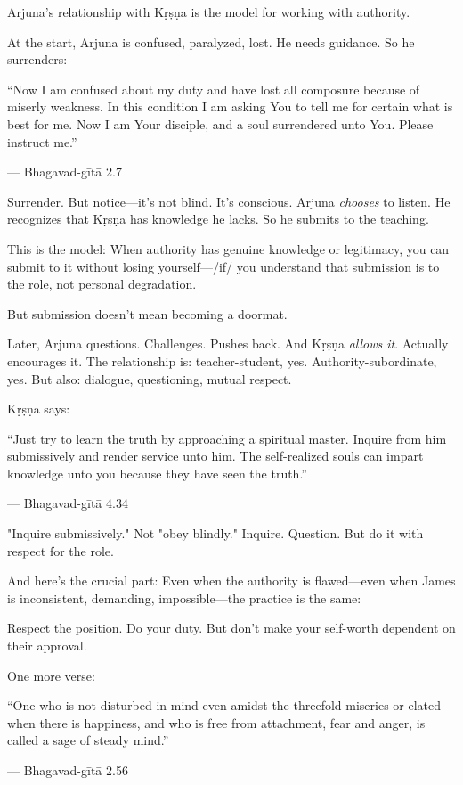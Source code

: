 \documentclass[11pt,twoside]{book}
\begin{document}
Arjuna's relationship with Kṛṣṇa is the model for working with authority.

At the start, Arjuna is confused, paralyzed, lost. He needs guidance. So he surrenders:

\begin{pullquote}
``Now I am confused about my duty and have lost all composure because of miserly weakness. In this condition I am asking You to tell me for certain what is best for me. Now I am Your disciple, and a soul surrendered unto You. Please instruct me.''

--- Bhagavad-gītā 2.7
\end{pullquote}

Surrender. But notice—it's not blind. It's conscious. Arjuna \emph{chooses} to listen. He recognizes that Kṛṣṇa has knowledge he lacks. So he submits to the teaching.

This is the model: When authority has genuine knowledge or legitimacy, you can submit to it without losing yourself—/if/ you understand that submission is to the role, not personal degradation.

But submission doesn't mean becoming a doormat.

Later, Arjuna questions. Challenges. Pushes back. And Kṛṣṇa \emph{allows it}. Actually encourages it. The relationship is: teacher-student, yes. Authority-subordinate, yes. But also: dialogue, questioning, mutual respect.

Kṛṣṇa says:

\begin{pullquote}
``Just try to learn the truth by approaching a spiritual master. Inquire from him submissively and render service unto him. The self-realized souls can impart knowledge unto you because they have seen the truth.''

--- Bhagavad-gītā 4.34
\end{pullquote}

"Inquire submissively." Not "obey blindly." Inquire. Question. But do it with respect for the role.

And here's the crucial part: Even when the authority is flawed—even when James is inconsistent, demanding, impossible—the practice is the same:

Respect the position. Do your duty. But don't make your self-worth dependent on their approval.

One more verse:

\begin{pullquote}
``One who is not disturbed in mind even amidst the threefold miseries or elated when there is happiness, and who is free from attachment, fear and anger, is called a sage of steady mind.''

--- Bhagavad-gītā 2.56
\end{pullquote}
\end{document}
